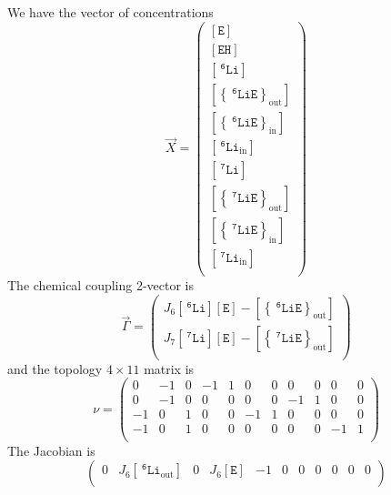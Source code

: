 \documentclass[aps,onecolumn,11pt]{revtex4}
\newcommand{\mychem}[1]{\mathtt{#1}}
\newcommand{\myconc}[1]{\left\lbrack{#1}\right\rbrack}
\newcommand{\spLi}[1]{{~^{\mychem{#1}}\mychem{Li}}}
\newcommand{\Li}[1]{\myconc{\spLi{#1}}}
\newcommand{\spEout}{\mychem{E}}
\newcommand{\Eout}{\myconc{\spEout}}
\newcommand{\spLiEin}[1]{\left\lbrace\spLi{#1}\spEout\right\rbrace_{\mathrm{in}}}
\newcommand{\LiEin}[1]{\myconc{\spLiEin{#1}}}
\newcommand{\spLiEout}[1]{\left\lbrace\spLi{#1}\spEout\right\rbrace_{\mathrm{out}}}
\newcommand{\LiEout}[1]{\myconc{\spLiEout{#1}}}
\newcommand{\spLiIn}[1]{{\spLi{#1}}_{\mathrm{in}}}
\newcommand{\LiIn}[1]{\myconc{\spLiIn{#1}}}
\newcommand{\spLiOut}[1]{{\spLi{#1}}_{\mathrm{out}}}
\newcommand{\LiOut}[1]{\myconc{\spLiOut{#1}}}
\newcommand{\spEHin}{\mychem{EH}}
\newcommand{\EHin}{\myconc{\spEHin}}
\newcommand{\proton}{\mathrm{h}}
\begin{document}
We have the vector of concentrations
\begin{equation}
	\vec{X} = 
	\begin{pmatrix}
	\Eout\\
	\EHin\\
	\Li{6}\\
	\LiEout{6}\\
	\LiEin{6}\\
	\LiIn{6}\\
	\Li{7}\\
	\LiEout{7}\\
	\LiEin{7}\\
	\LiIn{7}\\
	\end{pmatrix}
\end{equation}
The chemical coupling 2-vector is
\begin{equation}
\vec{\Gamma} = 
\begin{pmatrix}
J_6 \Li{6} \Eout - \LiEout{6}\\
J_7 \Li{7} \Eout - \LiEout{7}\\
\end{pmatrix}
\end{equation}
and the topology  $4\times11$ matrix is
\begin{equation}
\nu = 
\left(
\begin{array}{ccccccccccc}
0 & -1 & 0 & -1 & 1 & 0 & 0 & 0 & 0 & 0 & 0\\
0 & -1 & 0 & 0 & 0 & 0 & 0 & -1 & 1 & 0 & 0\\
-1 & 0 & 1 & 0 & 0 & -1 & 1 & 0 & 0 &0 &0\\
-1 & 0 & 1 & 0 & 0 & 0 & 0 & 0 & 0 & -1 & 1\\
\end{array}
\right)
\end{equation}
The Jacobian is
\begin{equation}
\left(
\begin{array}{ccccccccccc}
0&J_6\LiOut{6}&0&J_6\Eout&-1&0&0&0&0&0&0\\
\end{array}
\right)
\end{equation}
\end{document}
